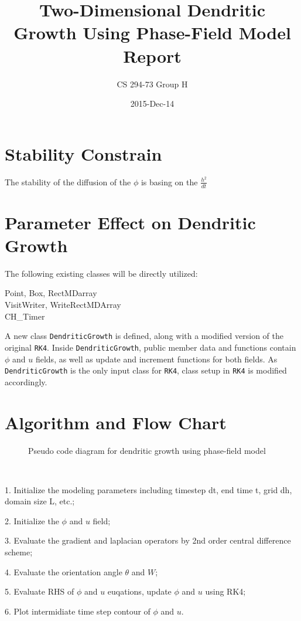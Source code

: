 \documentclass{article}
\title{Two-Dimensional Dendritic Growth Using Phase-Field Model \\ Report}
\date{2015-Dec-14}
\author{CS 294-73 Group H}
\begin{document}
\maketitle
    
\section{Stability Constrain}
The stability of the diffusion of the $\phi$ is basing on the $\frac{h^2}{dt}$



\section{Parameter Effect on Dendritic Growth}
The following existing classes will be directly utilized:
\begin{description}
\item[Point, Box, RectMDarray]
\item[VisitWriter, WriteRectMDArray]
\item[CH\_Timer]
\end{description}
A new class \texttt{DendriticGrowth} is defined, along with a modified version of the original \texttt{RK4}. Inside \texttt{DendriticGrowth}, public member data and functions contain $\phi$ and $u$ fields, as well as update and increment functions for both fields. As \texttt{DendriticGrowth} is the only input class for \texttt{RK4}, class setup in \texttt{RK4} is modified accordingly. 

\section{Algorithm and Flow Chart}
\begin{figure}[htb!]
\begin{center}
\caption{Pseudo code diagram for dendritic growth using phase-field model}
\end{center}
\end{figure}
\par \ 
\par 1. Initialize the modeling parameters including timestep dt, end time t, grid dh, domain size L, etc.;
\par 2. Initialize the $\phi$ and $u$ field;
\par 3. Evaluate the gradient and laplacian operators by 2nd order central difference scheme; 
\par 4. Evaluate the orientation angle $\theta$ and $W$;
\par 5. Evaluate RHS of $\phi$ and $u$ euqations, update $\phi$ and $u$ using RK4;
\par 6. Plot intermidiate time step contour of $\phi$ and $u$.
\end{document}
